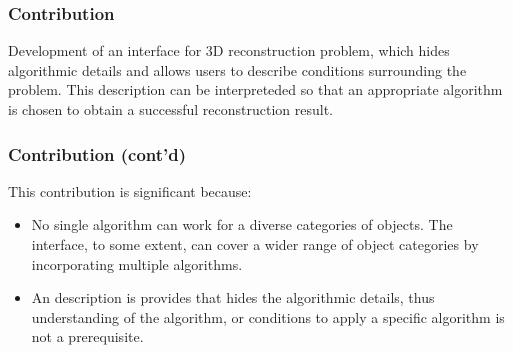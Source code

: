 \documentclass{beamer}
\begin{document}
\begin{frame}
\frametitle{Contribution}
Development of an interface for 3D reconstruction problem, which hides algorithmic details and allows users to describe conditions surrounding the problem. This description can be interpreteded so that an appropriate algorithm is chosen to obtain a successful reconstruction result.
\end{frame}

\begin{frame}
\frametitle{Contribution (cont'd)}
This contribution is significant because:
\begin{itemize}
\item No single algorithm can work for a diverse categories of objects. The interface, to some extent, can cover a wider range of object categories by incorporating multiple algorithms.
\item An description is provides that hides the algorithmic details, thus understanding of the algorithm, or conditions to apply a specific algorithm is not a prerequisite.
\end{itemize}
\end{frame}





\end{document}
